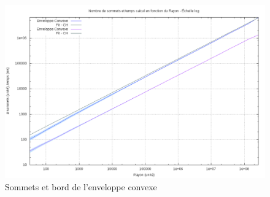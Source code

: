 \begin{figure}[H]
  \centering
  \includegraphics[width=\linewidth]{fig/4-exi/ch/exi-ch-sommet.png}
  \caption{Sommets et bord de l'enveloppe convexe}
\end{figure}

